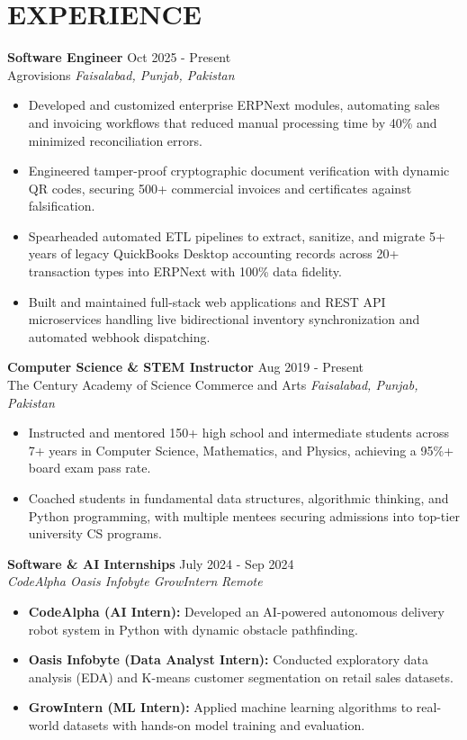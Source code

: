 \documentclass[11pt]{article}
\newcommand{\rSection}[1]{\section{\uppercase{#1}}}
\begin{document}
\rSection{Experience}

\textbf{Software Engineer} \hfill {Oct 2025 - Present}\\
Agrovisions \hfill \textit{Faisalabad, Punjab, Pakistan}
 \begin{itemize}[noitemsep,topsep=2pt]
    \item Developed and customized enterprise ERPNext modules, automating sales and invoicing workflows that reduced manual processing time by 40\% and minimized reconciliation errors.
    \item Engineered tamper-proof cryptographic document verification with dynamic QR codes, securing 500+ commercial invoices and certificates against falsification.
    \item Spearheaded automated ETL pipelines to extract, sanitize, and migrate 5+ years of legacy QuickBooks Desktop accounting records across 20+ transaction types into ERPNext with 100\% data fidelity.
    \item Built and maintained full-stack web applications and REST API microservices handling live bidirectional inventory synchronization and automated webhook dispatching.
 \end{itemize}

\textbf{Computer Science \& STEM Instructor} \hfill {Aug 2019 - Present}\\
The Century Academy of Science Commerce and Arts \hfill \textit{Faisalabad, Punjab, Pakistan}
 \begin{itemize}[noitemsep,topsep=2pt]
    \item Instructed and mentored 150+ high school and intermediate students across 7+ years in Computer Science, Mathematics, and Physics, achieving a 95\%+ board exam pass rate.
    \item Coached students in fundamental data structures, algorithmic thinking, and Python programming, with multiple mentees securing admissions into top-tier university CS programs.
 \end{itemize}

\textbf{Software \& AI Internships} \hfill {July 2024 - Sep 2024}\\
\textit{CodeAlpha \textbullet{} Oasis Infobyte \textbullet{} GrowIntern} \hfill \textit{Remote}
 \begin{itemize}[noitemsep,topsep=2pt]
    \item \textbf{CodeAlpha (AI Intern):} Developed an AI-powered autonomous delivery robot system in Python with dynamic obstacle pathfinding.
    \item \textbf{Oasis Infobyte (Data Analyst Intern):} Conducted exploratory data analysis (EDA) and K-means customer segmentation on retail sales datasets.
    \item \textbf{GrowIntern (ML Intern):} Applied machine learning algorithms to real-world datasets with hands-on model training and evaluation.
 \end{itemize}
\end{document}
